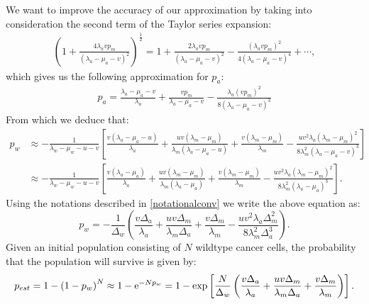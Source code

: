 \documentclass[11pt,a4paper]{article}
\newcommand{\e}{{\rm e}}
\begin{document}
We want to improve the accuracy of our approximation by taking into consideration the second term of the Taylor series expansion:
\begin{align*}
\left(1+\frac{4\lambda_avp_m}{\left(\lambda_a-\mu_a-v\right)^2}\right)^{\frac{1}{2}}=1+\frac{2\lambda_avp_m}{\left(\lambda_a-\mu_a-v\right)^2}-\frac{\left(\lambda_avp_m\right)^2}{4\left(\lambda_a-\mu_a-v\right)^4}+\cdots,
\end{align*}
which gives us the following approximation for $p_a$:
\begin{align}
p_a=\frac{\lambda_a-\mu_a-v}{\lambda_a}+\frac{vp_m}{\lambda_a-\mu_a-v}-\frac{\lambda_a\left(vp_m\right)^2}{8\left(\lambda_a-\mu_a-v\right)^3}
\end{align}
From which we deduce that:
\begin{align}\nonumber
p_w&\approx-\frac{1}{\lambda_w-\mu_w-u-v}\left[\frac{v\left(\lambda_a-\mu_a-u\right)}{\lambda_a}+\frac{uv\left(\lambda_m-\mu_m\right)}{\lambda_m\left(\lambda_a-\mu_a-u\right)}+\frac{v\left(\lambda_m-\mu_m\right)}{\lambda_m}-\frac{uv^2\lambda_a\left(\lambda_m-\mu_m\right)^2}{8\lambda_m^2\left(\lambda_a-\mu_a-v\right)^3}\right]\\ \label{survprobw}
&\approx-\frac{1}{\lambda_w-\mu_w-u-v}\left[\frac{v\left(\lambda_a-\mu_a\right)}{\lambda_a}+\frac{uv\left(\lambda_m-\mu_m\right)}{\lambda_m\left(\lambda_a-\mu_a\right)}+\frac{v\left(\lambda_m-\mu_m\right)}{\lambda_m}-\frac{uv^2\lambda_a\left(\lambda_m-\mu_m\right)^2}{8\lambda_m^2\left(\lambda_a-\mu_a\right)^3}\right].
\end{align}
Using the notations described in \eqref{notationalconv} we write the above equation as:
\begin{equation}\label{survprobwapproxcorrected}
p_w=-\frac{1}{\Delta_w}\left(\frac{v\Delta_a}{\lambda_a}+\frac{uv\Delta_m}{\lambda_m\Delta_a}+\frac{v\Delta_m}{\lambda_m}-\frac{uv^2\lambda_a\Delta_m^2}{8\lambda_m^2\Delta_a^3}\right).
\end{equation}
Given an initial population consisting of $N$ wildtype cancer cells, the probability that the population will survive is given by: 
\begin{align}
p_{est}=1-\left(1-p_w\right)^N\approx 1-\e^{-Np_w}=1-\exp\left[\frac{N}{\Delta_w}\left(\frac{v\Delta_a}{\lambda_a}+\frac{uv\Delta_m}{\lambda_m\Delta_a}+\frac{v\Delta_m}{\lambda_m}\right)\right].
\end{align}
\end{document}
